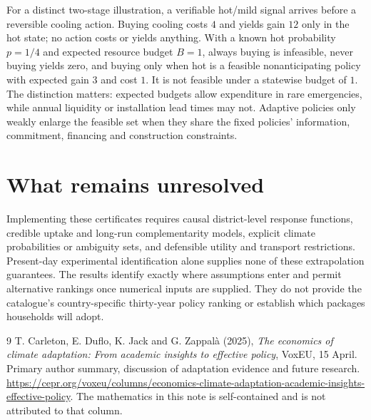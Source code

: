 \documentclass[11pt,a4paper]{article}
\begin{document}
For a distinct two-stage illustration, a verifiable hot/mild signal arrives before a reversible cooling action. Buying cooling costs $4$ and yields gain $12$ only in the hot state; no action costs or yields anything. With a known hot probability $p=1/4$ and expected resource budget $B=1$, always buying is infeasible, never buying yields zero, and buying only when hot is a feasible nonanticipating policy with expected gain $3$ and cost $1$. It is not feasible under a statewise budget of $1$. The distinction matters: expected budgets allow expenditure in rare emergencies, while annual liquidity or installation lead times may not. Adaptive policies only weakly enlarge the feasible set when they share the fixed policies' information, commitment, financing and construction constraints.

\section{What remains unresolved}
Implementing these certificates requires causal district-level response functions, credible uptake and long-run complementarity models, explicit climate probabilities or ambiguity sets, and defensible utility and transport restrictions. Present-day experimental identification alone supplies none of these extrapolation guarantees. The results identify exactly where assumptions enter and permit alternative rankings once numerical inputs are supplied. They do not provide the catalogue's country-specific thirty-year policy ranking or establish which packages households will adopt.

\begin{thebibliography}{9}
 T. Carleton, E. Duflo, K. Jack and G. Zappal\`a (2025), \emph{The economics of climate adaptation: From academic insights to effective policy}, VoxEU, 15 April. Primary author summary, discussion of adaptation evidence and future research. \url{https://cepr.org/voxeu/columns/economics-climate-adaptation-academic-insights-effective-policy}. The mathematics in this note is self-contained and is not attributed to that column.
\end{thebibliography}
\end{document}

